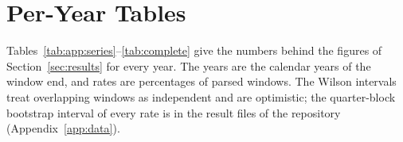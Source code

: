 \section{Per-Year Tables}
\label{app:tables}

Tables~\ref{tab:app:series}--\ref{tab:complete} give the numbers behind the figures of Section~\ref{sec:results} for every year. The years are the calendar years of the window end, and rates are percentages of parsed windows. The Wilson intervals treat overlapping windows as independent and are optimistic; the quarter-block bootstrap interval of every rate is in the result files of the repository (Appendix~\ref{app:data}).

